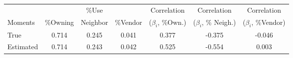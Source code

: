 \begin{tabular}{lcccccc}
      &            & \%Use   &            &       Correlation   &       Correlation   &       Correlation    \\
   Moments      &   \%Owning  &  Neighbor  &  \%Vendor &   ($\beta_i$, \%Own.) &   ($\beta_i$, \% Neigh.) &   ($\beta_i$, \%Vendor)    \\
\hline
 True  &0.714 &0.245 &0.041 &0.377 &-0.375 &-0.046 \\
 Estimated  &0.714 &0.243 &0.042 &0.525 &-0.554 &0.003 \\
\hline
\end{tabular}
